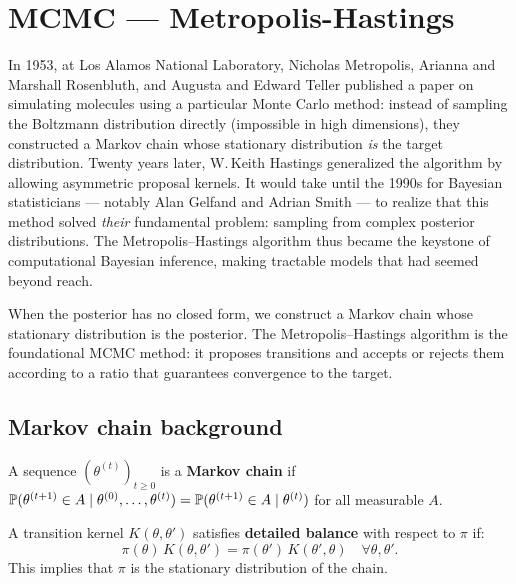 \chapter{MCMC --- Metropolis-Hastings}
\label{ch:metropolis}

In 1953, at Los Alamos National Laboratory, Nicholas Metropolis, Arianna and Marshall Rosenbluth, and Augusta and Edward Teller published a paper on simulating molecules using a particular Monte Carlo method: instead of sampling the Boltzmann distribution directly (impossible in high dimensions), they constructed a Markov chain whose stationary distribution \emph{is} the target distribution. Twenty years later, W.\,Keith Hastings generalized the algorithm by allowing asymmetric proposal kernels. It would take until the 1990s for Bayesian statisticians --- notably Alan Gelfand and Adrian Smith --- to realize that this method solved \emph{their} fundamental problem: sampling from complex posterior distributions. The Metropolis--Hastings algorithm thus became the keystone of computational Bayesian inference, making tractable models that had seemed beyond reach.

\begin{intuition}[title=\textbf{Central idea}]
When the posterior has no closed form, we construct a Markov chain
whose stationary distribution is the posterior. The Metropolis--Hastings
algorithm is the foundational MCMC method: it proposes transitions and
accepts or rejects them according to a ratio that guarantees convergence
to the target.
\end{intuition}

\section{Markov chain background}

\begin{definition}
A sequence $(\theta^{(t)})_{t \geq 0}$ is a \textbf{Markov chain} if
$\mathbb{P}(\theta^{(t+1)} \in A \mid \theta^{(0)}, \ldots, \theta^{(t)})
= \mathbb{P}(\theta^{(t+1)} \in A \mid \theta^{(t)})$ for all measurable $A$.
\end{definition}

\begin{definition}
A transition kernel $K(\theta, \theta')$ satisfies \textbf{detailed
balance} with respect to $\pi$ if:
\[
  \pi(\theta)\,K(\theta, \theta') = \pi(\theta')\,K(\theta', \theta)
  \quad \forall \theta, \theta'.
\]
This implies that $\pi$ is the stationary distribution of the chain.
\end{definition}


